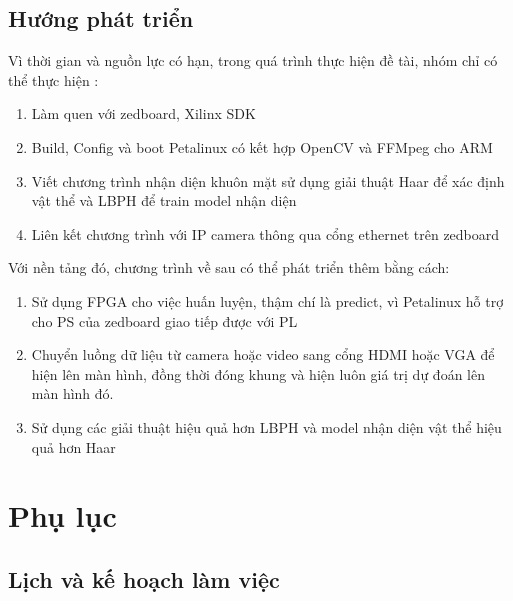 \documentclass[a4paper]{report}
\begin{document}
\section{Hướng phát triển}
Vì thời gian và nguồn lực có hạn, trong quá trình thực hiện đề tài, nhóm chỉ có thể thực hiện :
\begin{enumerate}
\item Làm quen với zedboard, Xilinx SDK
\item Build, Config và boot Petalinux có kết hợp OpenCV và FFMpeg cho ARM 
\item Viết chương trình nhận diện khuôn mặt sử dụng giải thuật Haar để xác định vật thể và LBPH để train model nhận diện
\item Liên kết chương trình với IP camera thông qua cổng ethernet trên zedboard
\end{enumerate} 
Với nền tảng đó, chương trình về sau có thể phát triển thêm bằng cách:
\begin{enumerate}
\item Sử dụng FPGA cho việc huấn luyện, thậm chí là predict, vì Petalinux hỗ trợ cho PS của zedboard giao tiếp được với PL
\item Chuyển luồng dữ liệu từ camera hoặc video sang cổng HDMI hoặc VGA để hiện lên màn hình, đồng thời đóng khung và hiện luôn giá trị dự đoán lên màn hình đó.
\item Sử dụng các giải thuật hiệu quả hơn LBPH và model nhận diện vật thể hiệu quả hơn Haar
\end{enumerate}

\cleardoublepage
\chapter{Phụ lục}

\section{Lịch và kế hoạch làm việc}
\end{document}
